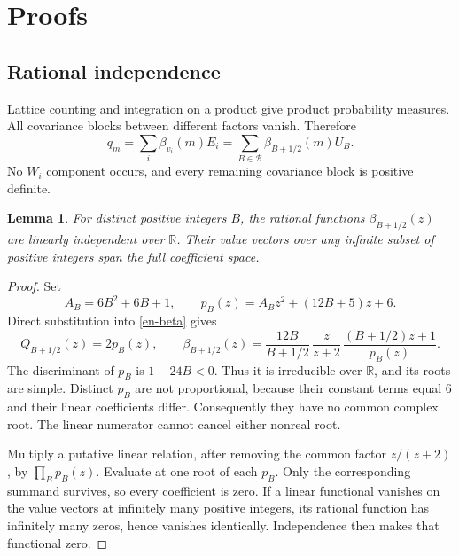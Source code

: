 \documentclass[12pt]{amsart}
\newtheorem{lem}[thm]{Lemma}
\theoremstyle{definition}
\theoremstyle{remark}
\numberwithin{equation}{section}
\newcommand{\R}{\mathbb{R}}
\begin{document}
\section{Proofs}

\subsection{Rational independence}
Lattice counting and integration on a product give product probability measures. All covariance blocks between different factors vanish. Therefore
\begin{equation}\label{en-productq}
 q_m=\sum_i\beta_{v_i}(m)E_i
     =\sum_{B\in\mathcal B}\beta_{B+1/2}(m)U_B.
\end{equation}
No $W_i$ component occurs, and every remaining covariance block is positive definite.

\begin{lem}\label{en-independence}
For distinct positive integers $B$, the rational functions $\beta_{B+1/2}(z)$ are linearly independent over $\R$. Their value vectors over any infinite subset of positive integers span the full coefficient space.
\end{lem}
\begin{proof}
Set
\begin{equation}\label{en-quadratics}
 A_B=6B^2+6B+1,\qquad
 p_B(z)=A_Bz^2+(12B+5)z+6.
\end{equation}
Direct substitution into \eqref{en-beta} gives
\[
 Q_{B+1/2}(z)=2p_B(z),\qquad
 \beta_{B+1/2}(z)=\frac{12B}{B+1/2}\,
 \frac{z}{z+2}\,\frac{(B+1/2)z+1}{p_B(z)}.
\]
The discriminant of $p_B$ is $1-24B<0$. Thus it is irreducible over $\R$, and its roots are simple. Distinct $p_B$ are not proportional, because their constant terms equal $6$ and their linear coefficients differ. Consequently they have no common complex root. The linear numerator cannot cancel either nonreal root.

Multiply a putative linear relation, after removing the common factor $z/(z+2)$, by $\prod_Bp_B(z)$. Evaluate at one root of each $p_B$. Only the corresponding summand survives, so every coefficient is zero. If a linear functional vanishes on the value vectors at infinitely many positive integers, its rational function has infinitely many zeros, hence vanishes identically. Independence then makes that functional zero.
\end{proof}
\end{document}
